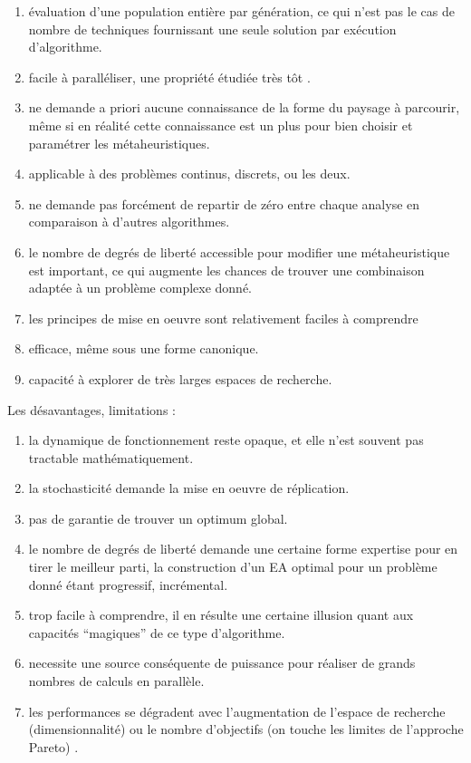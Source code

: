 \begin{enumerate}[label=(\alph*),labelindent=\parindent,leftmargin=*]

	\item évaluation d'une population entière par génération, ce qui n'est pas le cas de nombre de techniques fournissant une seule solution par exécution d'algorithme.
	\item facile à paralléliser, une propriété étudiée très tôt \autocite[444]{Alba2002}.
	\item ne demande a priori aucune connaissance de la forme du paysage à parcourir, même si en réalité cette connaissance est un plus pour bien choisir et paramétrer les métaheuristiques.
	\item applicable à des problèmes continus, discrets, ou les deux.
	\item ne demande pas forcément de repartir de zéro entre chaque analyse en comparaison à d'autres algorithmes.
	\item le nombre de degrés de liberté accessible pour modifier une métaheuristique est important, ce qui augmente les chances de trouver une combinaison adaptée à un problème complexe donné.
	\item les principes de mise en oeuvre sont relativement faciles à comprendre
    \item efficace, même sous une forme canonique.
    \item capacité à explorer de très larges espaces de recherche.
\end{enumerate}

Les désavantages, limitations :

\begin{enumerate}[label=(\alph*),labelindent=\parindent,leftmargin=*]
	\item la dynamique de fonctionnement reste opaque, et elle n'est souvent pas tractable mathématiquement.
	\item la stochasticité demande la mise en oeuvre de réplication.
	\item pas de garantie de trouver un optimum global.
	\item le nombre de degrés de liberté demande une certaine forme expertise pour en tirer le meilleur parti, la construction d'un EA optimal pour un problème donné étant progressif, incrémental.
    \item trop facile à comprendre, il en résulte une certaine illusion quant aux capacités \enquote{magiques} de ce type d'algorithme.
    \item necessite une source conséquente de puissance pour réaliser de grands nombres de calculs en parallèle.
    \item les performances se dégradent avec l'augmentation de l'espace de recherche (dimensionnalité) ou le nombre d'objectifs (on touche les limites de l'approche Pareto) \autocite[24]{Zitzler1999a}.
\end{enumerate}

